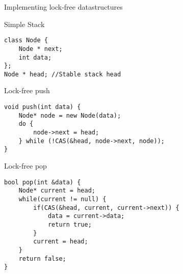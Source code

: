 \begin{frame}{Implementing lock-free datastructures}
\begin{block}{Simple Stack}
\begin{lstlisting}[style=customc]
class Node {
    Node * next;
    int data;
};
Node * head; //Stable stack head
\end{lstlisting}
\end{block} 

\begin{block}{Lock-free push}
\begin{lstlisting}[style=customc]
void push(int data) {
    Node* node = new Node(data);
    do {
        node->next = head;
    } while (!CAS(&head, node->next, node));
}
\end{lstlisting}
\end{block}

\begin{block}{Lock-free pop}
\begin{lstlisting}[style=customc]
bool pop(int &data) {
    Node* current = head;
    while(current != null) { 
        if(CAS(&head, current, current->next)) {
            data = current->data;
            return true;
        }
        current = head;
    }
    return false;
}
\end{lstlisting}
\end{block}

\end{frame}

